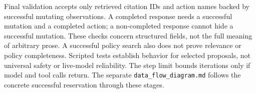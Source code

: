 \documentclass[11pt,letterpaper]{article}
\begin{document}
Final validation accepts only retrieved citation IDs and action names backed by successful mutating observations. A completed response needs a successful mutation and a completed action; a non-completed response cannot hide a successful mutation. These checks concern structured fields, not the full meaning of arbitrary prose. A successful policy search also does not prove relevance or policy completeness. Scripted tests establish behavior for selected proposals, not universal safety or live-model reliability. The step limit bounds iterations only if model and tool calls return. The separate \texttt{data\_flow\_diagram.md} follows the concrete successful reservation through these stages.
\end{document}
